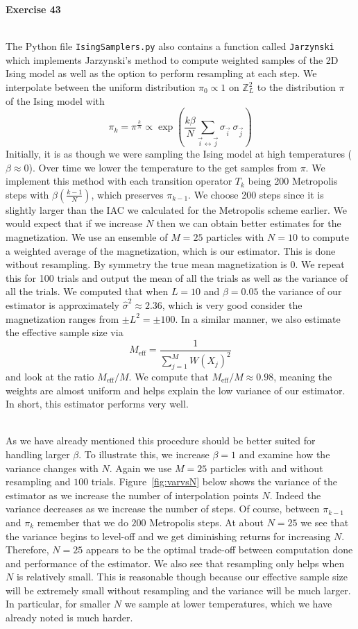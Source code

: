 \documentclass[11pt,a4paper]{amsart}
\begin{document}
{\bf Exercise 43}\\
\\
\par The Python file {\tt IsingSamplers.py} also contains a function called {\tt Jarzynski} which implements Jarzynski's method to compute weighted samples of the 2D Ising model as well as the option to perform resampling at each step.  We interpolate between the uniform distribution $\pi_0 \propto 1$ on $\mathbb{Z}_L^2$ to the distribution $\pi$ of the Ising model with
\[
\pi_k = \pi^{\frac{k}{N}} \propto \exp\left(  \frac{k\beta}{N} \sum_{\vec{i} \leftrightarrow \vec{j}} \sigma_{\vec{i}}\ \sigma_{\vec{j}}  \right)
\]
Initially, it is as though we were sampling the Ising model at high temperatures ($\beta \approx 0$).  Over time we lower the temperature to the get samples from $\pi$.  We implement this method with each transition operator $T_k$ being 200 Metropolis steps with $\beta \left(\frac{k-1}{N}\right)$, which preserves $\pi_{k-1}$.  We choose 200 steps since it is slightly larger than the IAC we calculated for the Metropolis scheme earlier.  We would expect that if we increase $N$ then we can obtain better estimates for the magnetization.  We use an ensemble of $M = 25$ particles with $N=10$ to compute a weighted average of the magnetization, which is our estimator.  This is done without resampling.  By symmetry the true mean magnetization is 0.  We repeat this for 100 trials and output the mean of all the trials as well as the variance of all the trials.  We computed that when $L=10$ and $\beta = 0.05$ the variance of our estimator is approximately $\hat{\sigma}^2 \approx 2.36$, which is very good consider the magnetization ranges from $\pm L^2 = \pm 100$.  In a similar manner, we also estimate the effective sample size via
\[
M_{\text{eff}} = \frac{1}{\sum_{j=1}^M W(X_j)^2}
\]
and look at the ratio $M_{\text{eff}}/M$.  We compute that $M_{\text{eff}}/M \approx 0.98$, meaning the weights are almost uniform and helps explain the low variance of our estimator.  In short, this estimator performs very well.
\\
\\

\par As we have already mentioned this procedure should be better suited for handling larger $\beta$.  To illustrate this, we increase $\beta = 1$ and examine how the variance changes with $N$.  Again we use $M=25$ particles with and without resampling and $100$ trials.  Figure~\ref{fig:varvsN} below shows the variance of the estimator as we increase the number of interpolation points $N$.  Indeed the variance decreases as we increase the number of steps.  Of course, between $\pi_{k-1}$ and $\pi_k$ remember that we do $200$ Metropolis steps.  At about $N=25$ we see that the variance begins to level-off and we get diminishing returns for increasing $N$.  Therefore, $N=25$ appears to be the optimal trade-off between computation done and performance of the estimator.  We also see that resampling only helps when $N$ is relatively small.  This is reasonable though because our effective sample size will be extremely small without resampling and the variance will be much larger.  In particular, for smaller $N$ we sample at lower temperatures, which we have already noted is much harder.
\end{document}
